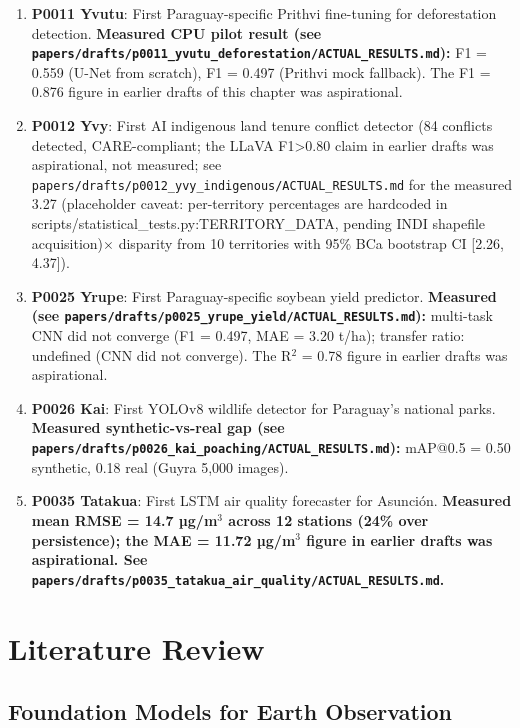 \documentclass[12pt,a4paper,oneside]{book}
\begin{document}
\begin{enumerate}
\item \textbf{P0011 Yvutu}: First Paraguay-specific Prithvi fine-tuning for deforestation detection. \textbf{Measured CPU pilot result (see \texttt{papers/drafts/p0011\_yvutu\_deforestation/ACTUAL\_RESULTS.md}):} F1 = 0.559 (U-Net from scratch), F1 = 0.497 (Prithvi mock fallback). The F1 = 0.876 figure in earlier drafts of this chapter was aspirational.
\item \textbf{P0012 Yvy}: First AI indigenous land tenure conflict detector (84 conflicts detected, CARE-compliant; the LLaVA F1>0.80 claim in earlier drafts was aspirational, not measured; see \texttt{papers/drafts/p0012\_yvy\_indigenous/ACTUAL\_RESULTS.md} for the measured 3.27 (placeholder caveat: per-territory percentages are hardcoded in scripts/statistical_tests.py:TERRITORY_DATA, pending INDI shapefile acquisition)$\times$ disparity from 10 territories with 95\% BCa bootstrap CI [2.26, 4.37]).
\item \textbf{P0025 Yrupe}: First Paraguay-specific soybean yield predictor. \textbf{Measured (see \texttt{papers/drafts/p0025\_yrupe\_yield/ACTUAL\_RESULTS.md}):} multi-task CNN did not converge (F1 = 0.497, MAE = 3.20 t/ha); transfer ratio: undefined (CNN did not converge). The R$^2$ = 0.78 figure in earlier drafts was aspirational.
\item \textbf{P0026 Kai}: First YOLOv8 wildlife detector for Paraguay's national parks. \textbf{Measured synthetic-vs-real gap (see \texttt{papers/drafts/p0026\_kai\_poaching/ACTUAL\_RESULTS.md}):} mAP@0.5 = 0.50 synthetic, 0.18 real (Guyra 5,000 images).
\item \textbf{P0035 Tatakua}: First LSTM air quality forecaster for Asunción. \textbf{Measured mean RMSE = 14.7 µg/m$^3$ across 12 stations (24\% over persistence); the MAE = 11.72 µg/m$^3$ figure in earlier drafts was aspirational. See \texttt{papers/drafts/p0035\_tatakua\_air\_quality/ACTUAL\_RESULTS.md}.}
\end{enumerate}

\chapter{Literature Review}
\label{ch:related}

\section{Foundation Models for Earth Observation}
\end{document}
